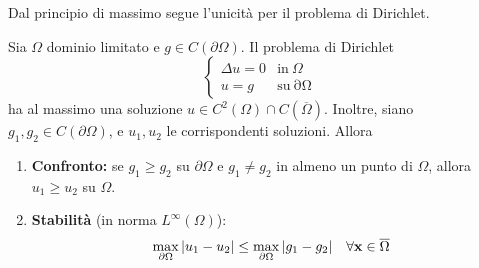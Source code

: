 Dal principio di massimo segue l'unicità per il problema di Dirichlet.
\begin{theorem}
    \label{thm:armoniche-unicita-dirichlet}
    Sia $\displaystyle \Omega $ dominio limitato e $\displaystyle g\in C(\partial \Omega)$. Il problema di Dirichlet
    \begin{equation*}
        \begin{cases}
            \Delta u=0 & \text{in} \ \Omega                   \\
            u=g        & \text{su}\mathrm{\ \partial \Omega }
        \end{cases}
    \end{equation*}
    ha al massimo una soluzione $\displaystyle u\in C^{2}(\Omega) \cap C(\overline{\Omega})$. Inoltre, siano $\displaystyle g_{1},g_{2} \in C(\partial \Omega)$, e $\displaystyle u_{1},u_{2}$ le corrispondenti soluzioni. Allora
    \begin{enumerate}
        \item \textbf{Confronto:} se $\displaystyle g_{1} \geq g_{2}$ su $\displaystyle \partial \Omega$ e $g_{1}\neq g_{2}$ in almeno un punto di $\Omega$, allora $u_{1} \geq u_{2}$ su $\displaystyle \Omega $.
        \item \textbf{Stabilità }(in norma $\displaystyle L^{\infty }(\Omega)$):
              \begin{equation}
                  \max_{\partial \Omega }| u_{1} -u_{2}| \leq \max_{\partial \Omega }| g_{1} -g_{2}| \quad \forall \mathbf{x}\in \overline{\Omega }
                  \label{eq:lap-stabilita}
              \end{equation}
    \end{enumerate}
\end{theorem}
